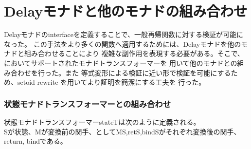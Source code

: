 \documentclass[japanese]{jssst_ppl}
\theoremstyle{definition}
\newtheorem{definition}[theorem]{定義}
\newcommand{\bind}{\rm{bind}}
\newcommand{\ret}{\rm{return}}
\newcommand{\binds}{ \gg = }
\begin{document}
\iffalse
  \section{Delayモナドと他のモナドの組み合わせ}
  Delayモナドのinterfaceを定義することで、一般再帰関数に対する検証が可能になった。
  この手法をより多くの関数へ適用するためには、Delayモナドを他のモナドと組み合わせることにより
  複雑な副作用を表現する必要がある。そこで、\cite{ddd}においてサポートされたモナドトランスフォーマーを
  用いて他のモナドとの組み合わせを行った。また
  等式変形による検証に近い形で検証を可能にするため、setoid rewrite を用いてより証明を簡潔にする工夫を
  行った。


  \iffalse
    \subsubsection{モナドトランスフォーマーの定義}
    (論文の名前)にしたがってモナドトランスフォーマーの定義を述べる。


    \begin{definition}
      M,Nがモナドであるとする。この時、自然変換$\xi: M \to N$がモナド射であるとは、$\xi$が以下の2つの等式を満たす時のことである。
      \begin{center}
        $ \ret_A^N a = \xi_A (\ret_A^M \, a)$ \\
        $ \xi_B \,(m \binds_M f) = \xi_A m \binds_N \xi_B \cdot f $ \\
      \end{center}
    \end{definition}

    \begin{definition}
      モナドトランスフォーマーMTは、4つの変換子からなる組$(\text{T},\ret^T,\bind^T,lift^T)$であり、
      任意のモナドMに対して、
      \begin{itemize}
        \item $(\text{TM}, \ret^T(ret, \bind), bind^T(\ret,\bind))$がモナド
        \item $\text{lift}^\text{T}(\ret,\bind)$がMからTMへのモナド射となる
      \end{itemize}
      を満たすものである。
    \end{definition}

  \fi


  \subsubsection{状態モナドトランスフォーマーとの組み合わせ}
  状態モナドトランスフォーマーstateTは次のように定義される。\\
  Sが状態、Mが変換前の関手、としてMS,retS,bindSがそれぞれ変換後の関手、return, bindである。
\end{document}
